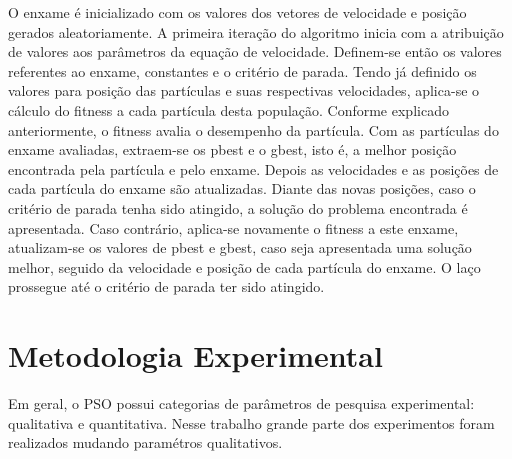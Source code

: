 \documentclass[conference]{IEEEtran}
\begin{document}
	O enxame é inicializado com os valores dos vetores de velocidade e posição gerados aleatoriamente. A primeira iteração do algoritmo inicia com a atribuição de valores aos parâmetros da equação de velocidade. Definem-se então os valores referentes ao enxame, constantes e o critério de parada. Tendo já definido os valores para posição das partículas e suas respectivas velocidades, aplica-se o cálculo do fitness a cada partícula desta população. Conforme explicado anteriormente, o fitness avalia o desempenho da partícula. Com as partículas do enxame avaliadas, extraem-se os pbest e o gbest, isto é, a melhor posição encontrada pela partícula e pelo enxame. Depois as velocidades e as posições de cada partícula do enxame são atualizadas. Diante das novas posições, caso o critério de parada tenha sido atingido, a solução do problema encontrada é apresentada. Caso contrário, aplica-se novamente o fitness a este enxame, atualizam-se os valores de pbest e gbest, caso seja apresentada uma solução melhor, seguido da velocidade e posição de cada partícula do enxame. O laço prossegue até o critério de parada ter sido atingido.
    
    
    \vspace*{1cm}
\section{Metodologia Experimental}
    
    Em geral, o PSO possui categorias de parâmetros de pesquisa experimental: qualitativa e quantitativa. Nesse trabalho grande parte dos experimentos foram realizados mudando paramétros qualitativos.
    
\end{document}
